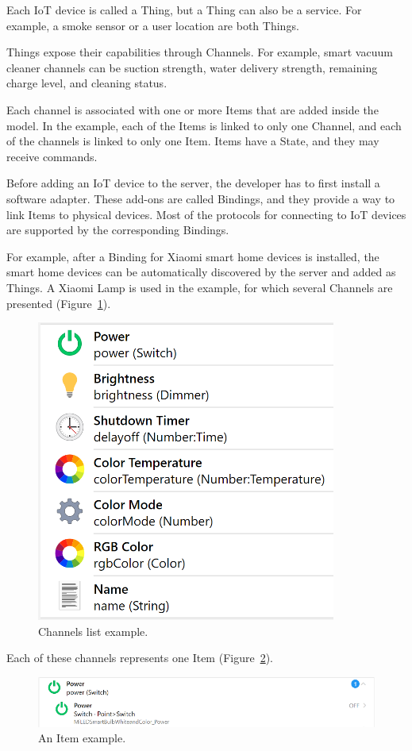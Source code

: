 Each IoT device is called a Thing, but a Thing can also be a service. For example, a smoke sensor or a user location are both Things.

Things expose their capabilities through Channels. For example, smart vacuum cleaner channels can be suction strength, water delivery strength, remaining charge level, and cleaning status.

Each channel is associated with one or more Items that are added inside the model. In the example, each of the Items is linked to only one Channel, and each of the channels is linked to only one Item. Items have a State, and they may receive commands. 

Before adding an IoT device to the server, the developer has to first install a software adapter. These add-ons are called Bindings, and they provide a way to link Items to physical devices. Most of the protocols for connecting to IoT devices are supported by the corresponding Bindings.

For example, after a Binding for Xiaomi smart home devices is installed, the smart home devices can be automatically discovered by the server and added as Things. A Xiaomi Lamp is used in the example, for which several Channels are presented (Figure~\ref{fig:XiaomiLampChannels-figure}).

\begin{figure}
  \centering
  \includegraphics[width=0.6\linewidth]{figures/XiaomiLampChannels.png}
  \caption{Channels list example.}
  \label{fig:XiaomiLampChannels-figure}
\end{figure}

Each of these channels represents one Item (Figure~\ref{fig:XiaomiLampPowerItem-figure}).

\begin{figure}
  \centering
  \includegraphics[width=0.9\linewidth]{figures/XiaomiLampPowerItem.png}
  \caption{An Item example.}
  \label{fig:XiaomiLampPowerItem-figure}
\end{figure}

